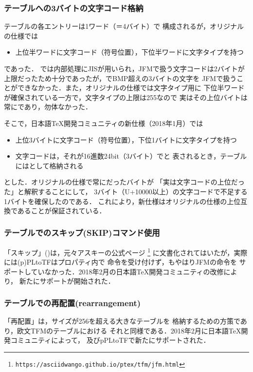\documentclass[a4paper,11pt,nomag]{jsarticle}
\begin{document}
\subsubsection{テーブルへの3バイトの文字コード格納}
テーブルの各エントリーは1ワード（＝4バイト）で
構成されるが，オリジナルの仕様では
\begin{itemize}
  \item 上位半ワードに文字コード（符号位置），下位半ワードに文字タイプを持つ
\end{itemize}
であった．
\pTeX{}では内部処理にJISが用いられ，JFMで扱う文字コードは2バイトが
上限だったため十分であったが，\upTeX{}でBMP超えの3バイトの文字を
JFMで扱うことができなかった．また，オリジナルの仕様では文字タイプ用に
下位半ワードが確保されている一方で，文字タイプの上限は255なので
実はその上位バイトは常にであり，勿体なかった．

そこで，日本語\TeX{}開発コミュニティの新仕様（2018年1月）では
\begin{itemize}
  \item 上位3バイトに文字コード（符号位置），下位1バイトに文字タイプを持つ
  \item 文字コードは，それが16進数24bit（3バイト）でと
    表されるとき，テーブルにはとして格納される
\end{itemize}
とした．オリジナルの仕様で常にだったバイトが
「実は文字コードの上位だった」と解釈することにして，
3バイト（U+10000以上）の文字コードで不足する1バイトを確保したのである．
これにより，新仕様はオリジナルの仕様の上位互換であることが保証されている．

\subsubsection{テーブルでのスキップ(SKIP)コマンド使用}
「スキップ」()は，元々アスキーの公式ページ
\footnote{\texttt{https://asciidwango.github.io/ptex/tfm/jfm.html}}
に文書化されてはいたが，実際には(p)PLtoTFはプロパティ内で
命令を受け付けず，\pTeX{}もやはりJFMの命令を
サポートしていなかった．2018年2月の日本語\TeX{}開発コミュニティの改修により，
新たにサポートが開始された．

\subsubsection{テーブルでの再配置(rearrangement)}
「再配置」は，サイズが256を超える大きなテーブルを
格納するための方策であり，欧文TFMのテーブルにおける
それと同様である．2018年2月に日本語\TeX{}開発コミュニティによって，
\pTeX{}及びpPLtoTFで新たにサポートされた．
\end{document}
